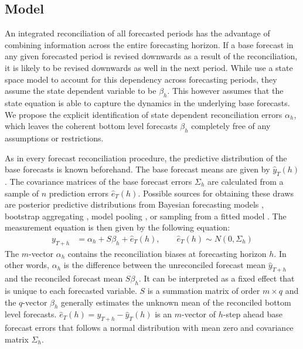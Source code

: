 \documentclass[a4paper,fleqn,11pt]{article}
\begin{document}
\subsection{Model}
An integrated reconciliation of all forecasted periods has the advantage of combining information across the entire forecasting horizon. If a base forecast in any given forecasted period is revised downwards as a result of the reconciliation, it is likely to be revised downwards as well in the next period. While \cite{Pennings2017} use a state space model to account for this dependency across forecasting periods, they assume the state dependent variable to be $\beta_h$. This however assumes that the state equation is able to capture the dynamics in the underlying base forecasts. We propose the explicit identification of state dependent reconciliation errors $\alpha_h$, which leaves the coherent bottom level forecasts $\beta_h$ completely free of any assumptions or restrictions.

As in every forecast reconciliation procedure, the predictive distribution of the base forecasts is known beforehand. The base forecast means are given by $\hat{y}_{T}(h)$. The covariance matrices of the base forecast errors $\Sigma_h$ are calculated from a sample of $n$ prediction errors $\hat{e}_{T}(h)$. Possible sources for obtaining these draws are posterior predictive distributions from Bayesian forecasting models \citep{Cesur2016}, bootstrap aggregating \citep{Bergmeir2016}, model pooling \citep{Timmermann2006}, or sampling from a fitted model \citep{Hyndman2018}. The measurement equation is then given by the following equation:
\begin{align}
\label{eq:main}
y_{T+h} & = \alpha_h + S \beta_h + \hat{e}_{T}(h), \qquad \hat{e}_{T}(h) \sim N(0, \Sigma_h)
\end{align}
The $m$-vector $\alpha_h$ contains the reconciliation biases at forecasting horizon $h$. In other words, $\alpha_h$ is the difference between the unreconciled forecast mean $\hat{y}_{T+h}$ and the reconciled forecast mean $S \beta_h$. It can be interpreted as a fixed effect that is unique to each forecasted variable. $S$ is a summation matrix of order $m \times q$ and the $q$-vector $\beta_h$ generally estimates the unknown mean of the reconciled bottom level forecasts.  $\hat{e}_{T}(h) = y_{T+h} - \hat{y}_{T}(h)$ is an $m$-vector of $h$-step ahead base forecast errors that follows a normal distribution with mean zero and covariance matrix $\Sigma_h$.
\end{document}
